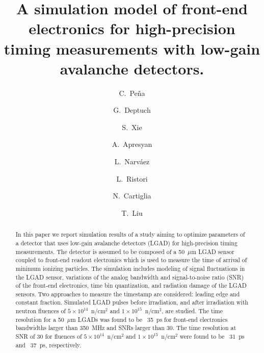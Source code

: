 \documentclass[preprint,1p]{elsarticle}
\begin{document}
\linenumbers

\begin{frontmatter}



\title{A simulation model of front-end electronics for high-precision timing measurements with low-gain avalanche detectors.}


\author[1,2]{C.~Pe\~na}
\author[1]{G.~Deptuch}
\author[2]{S.~Xie}
\author[1]{A.~Apresyan}
\author[2]{L.~Narv\'aez}
\author[1]{L.~Ristori}
\author[3]{N.~Cartiglia}
\author[1]{T.~Liu}

\address[1]{Fermi National Accelerator Laboratory, Batavia, IL, USA}
\address[2]{California Institute of Technology, Pasadena, CA, USA}
\address[3]{INFN, Torino, Italy}

\begin{abstract}
In this paper we report simulation results of a study aiming to optimize 
parameters of a detector that uses low-gain avalanche detectors (LGAD) for
high-precision timing measurements. The detector is assumed to be composed of a
50~$\mu$m LGAD sensor coupled to front-end readout electronics which is used to
measure the time of arrival of minimum ionizing particles. The simulation
includes modeling of signal fluctuations in the LGAD sensor, variations of the analog
bandwidth and signal-to-noise ratio (SNR) of the front-end electronics, time
bin quantization, and radiation damage of the LGAD sensors. Two approaches to
measure the timestamp are considered: leading edge and constant fraction.
Simulated LGAD pulses before irradiation, and after irradiation with 
neutron fluences of $5\times 10^{14}$~n/cm$^2$ and $1\times 10^{15}$~n/cm$^2$,
are studied. The time resolution for a 50~$\mu$m LGADs was found to be ~35~\si{ps}
for front-end electronics bandwidths larger than 350~\si{MHz} and SNRs larger
than 30. The time resolution at SNR of 30 for fluences of $5\times
10^{14}$~n/cm$^2$ and $1\times 10^{15}$~n/cm$^2$ were found to be ~31~\si{ps}
and ~37~\si{ps}, respectively. 
\end{abstract}


\end{frontmatter}
\end{document}

